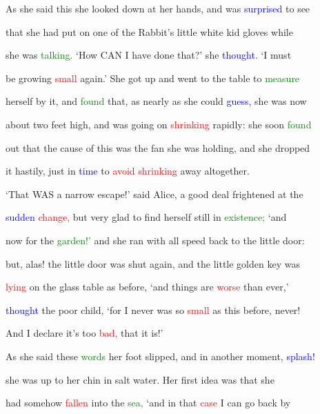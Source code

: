  As she said this she looked down at her hands, and was \textcolor{blue}{surprised} to see

 that she had put on one of the Rabbit’s little \textcolor{BurntOrange}{white} kid gloves while

 she was \textcolor{green}{talking.} ‘How CAN I have done that?’ she \textcolor{blue}{thought.} ‘I must

 be \textcolor{BurntOrange}{growing} \textcolor{red}{small} again.’ She got up and went to the table to \textcolor{green}{measure}

 herself by it, and \textcolor{green}{found} that, as nearly as she could \textcolor{blue}{guess,} she was now

 about two feet high, and was going on \textcolor{red}{shrinking} rapidly: she soon \textcolor{green}{found}

 out that the cause of this was the fan she was holding, and she dropped

 it hastily, just in \textcolor{blue}{time} to \textcolor{red}{avoid} \textcolor{red}{shrinking} away altogether.



 ‘That WAS a narrow \textcolor{BurntOrange}{escape!’} said Alice, a \textcolor{BurntOrange}{good} \textcolor{BurntOrange}{deal} \textcolor{BurntOrange}{frightened} at the

 \textcolor{blue}{sudden} \textcolor{red}{change,} but very \textcolor{BurntOrange}{glad} to find herself still in \textcolor{green}{existence;} ‘and

 now for the \textcolor{green}{garden!’} and she ran with all speed back to the little door:

 but, alas! the little door was shut again, and the little golden key was

 \textcolor{red}{lying} on the glass table as before, ‘and things are \textcolor{red}{worse} than ever,’

 \textcolor{blue}{thought} the poor \textcolor{BurntOrange}{child,} ‘for I never was so \textcolor{red}{small} as this before, never!

 And I declare it’s too \textcolor{red}{bad,} that it is!’



 As she said these \textcolor{green}{words} her foot \textcolor{BurntOrange}{slipped,} and in another moment, \textcolor{blue}{splash!}

 she was up to her chin in salt water. Her first idea was that she

 had somehow \textcolor{red}{fallen} into the \textcolor{green}{sea,} ‘and in that \textcolor{red}{case} I can go back by

